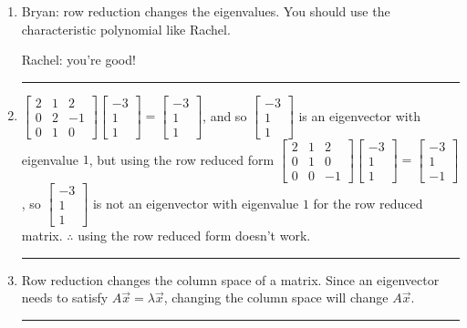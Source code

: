 \documentclass{article}
\newcommand{\mat}[1]{\begin{bmatrix}#1\end{bmatrix}}
\begin{document}
	\Large\bf

	\medskip


	\begin{enumerate}
		\color{Violet} \vspace{.2cm} \hrule

		\item Bryan: row reduction changes the eigenvalues. You should use the characteristic polynomial like Rachel.

			Rachel: you're good!

			\vspace{.2cm} \hrule

		\item $\mat{2&1&2\\0&2&-1\\0&1&0}\mat{-3\\1\\1}=\mat{-3\\1\\1}$, and so $\mat{-3\\1\\1}$ is an eigenvector with eigenvalue
			$1$, but using the row reduced form $\mat{2&1&2\\0&1&0\\0&0&-1}\mat{-3\\1\\1}=\mat{-3\\1\\-1}$, so $\mat{-3\\1\\1}$
			is not an eigenvector with eigenvalue $1$ for the row reduced matrix. $\therefore$ using the row reduced form doesn't work.

			\vspace{.2cm} \hrule

		\item Row reduction changes the column space of a matrix. Since an eigenvector needs to satisfy $A\vec x=\lambda \vec x$,
			changing the column space will change $A\vec x$.
			 \vspace{.2cm} \hrule
	\end{enumerate}
\end{document}

